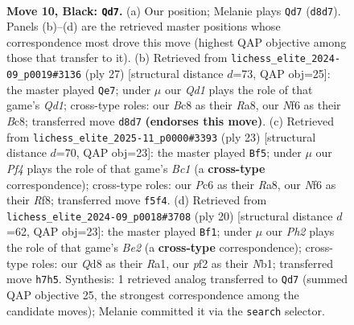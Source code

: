 \documentclass[11pt]{article}
\begin{document}
\clearpage

\begin{figure}[p]\centering
\begin{subfigure}{0.46\textwidth}\centering
\resizebox{\linewidth}{!}{%
\newchessgame
\chessboard[
  setfen={rnbqr1k1/pp4pp/2pbpn2/5p2/2PP4/2N2NP1/P3PPBP/R1BQR1K1 b - - 4 10},
  showmover=false,
  pgfstyle=straightmove, color=movearrow, markmove={d8-d7}
]}
\caption{}
\end{subfigure}\hfill
\begin{subfigure}{0.46\textwidth}\centering
\resizebox{\linewidth}{!}{%
\newchessgame
\chessboard[
  setfen={r1bqr1k1/pp3pp1/2pb1nnp/4p3/P3P3/2P1NNP1/1PQ2PBP/R1B1R1K1 b - - 0 14},
  showmover=false,
  pgfstyle=straightmove, color=movearrow, markmove={d8-e7}
]}
\caption{}
\end{subfigure}
\\[4pt]
\begin{subfigure}{0.46\textwidth}\centering
\resizebox{\linewidth}{!}{%
\newchessgame
\chessboard[
  setfen={r1b2rk1/4ppbp/nq1p1np1/2pP4/8/1PN2NP1/P2BPPBP/R2Q1RK1 b - - 0 12},
  showmover=false,
  pgfstyle=straightmove, color=movearrow, markmove={c8-f5}
]}
\caption{}
\end{subfigure}\hfill
\begin{subfigure}{0.46\textwidth}\centering
\resizebox{\linewidth}{!}{%
\newchessgame
\chessboard[
  setfen={r1bq1r1k/ppp3bp/2n2pp1/3np3/8/2PP1N2/PP2BPPP/RNBQR1K1 w - - 2 11},
  showmover=false,
  pgfstyle=straightmove, color=movearrow, markmove={e2-f1}
]}
\caption{}
\end{subfigure}
\caption{\textbf{Move 10, Black: \texttt{Qd7}.} (a) Our position; Melanie plays \texttt{Qd7} (\texttt{d8d7}). Panels (b)--(d) are the retrieved master positions whose correspondence most drove this move (highest QAP objective among those that transfer to it). (b) Retrieved from \texttt{lichess\_elite\_2024-09\_p0019\#3136} (ply 27) [structural distance $d$=73, QAP obj=25]: the master played \texttt{Qe7}; under $\mu$ our \emph{Qd1} plays the role of that game's \emph{Qd1}; cross-type roles: our \emph{B}c8 as their \emph{R}a8, our \emph{N}f6 as their \emph{B}c8; transferred move \texttt{d8d7} \textbf{(endorses this move)}. (c) Retrieved from \texttt{lichess\_elite\_2025-11\_p0000\#3393} (ply 23) [structural distance $d$=70, QAP obj=23]: the master played \texttt{Bf5}; under $\mu$ our \emph{Pf4} plays the role of that game's \emph{Bc1} (a \textbf{cross-type} correspondence); cross-type roles: our \emph{P}c6 as their \emph{R}a8, our \emph{N}f6 as their \emph{R}f8; transferred move \texttt{f5f4}. (d) Retrieved from \texttt{lichess\_elite\_2024-09\_p0018\#3708} (ply 20) [structural distance $d$=62, QAP obj=23]: the master played \texttt{Bf1}; under $\mu$ our \emph{Ph2} plays the role of that game's \emph{Be2} (a \textbf{cross-type} correspondence); cross-type roles: our \emph{Q}d8 as their \emph{R}a1, our \emph{p}f2 as their \emph{N}b1; transferred move \texttt{h7h5}. Synthesis: 1 retrieved analog transferred to \texttt{Qd7} (summed QAP objective 25, the strongest correspondence among the candidate moves); Melanie committed it via the \texttt{search} selector.}
\label{fig:thought-m19}
\end{figure}
\end{document}

